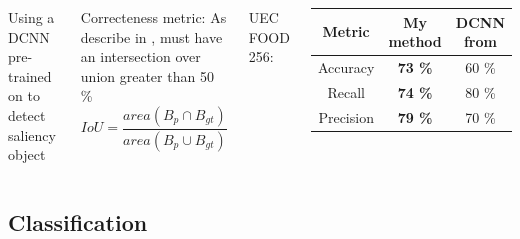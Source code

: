 \documentclass[aspectratio=169]{beamer}
\newenvironment{myframe}[1][t]{\begin{frame}[#1]{\secname}{\subsecname}}{\end{frame}}
\begin{document}
    \begin{myframe}
        \begin{columns}
            Using a DCNN pre-trained on \cite{zhang2015SOD} to detect saliency object
            
            \vspace{0.5cm}
            
            Correcteness metric: As describe in \cite{pascalVoc2012}, must have an intersection over union greater than 50 \%
            $$IoU = \frac{area(B_p \cap B_{gt})}{area(B_p \cup B_{gt})}$$
            
            
            UEC FOOD 256:
            
            \begin{center}
                \renewcommand{\arraystretch}{1.3} %
                \begin{tabular}{||c | c c||} 
                    \hline
                    Metric & My method & DCNN from \cite{Bolanos2016} \\
                    \hline\hline
                    Accuracy & \textbf{73 \%} & 60 \% \\ 
                    \hline
                    Recall &  \textbf{74 \%} & 80 \% \\
                    \hline
                    Precision &  \textbf{79 \%} & 70 \% \\
                    \hline
                \end{tabular}
            \end{center}
        \end{columns}
    \end{myframe}
    
    \subsection{Classification}
    
\end{document}

